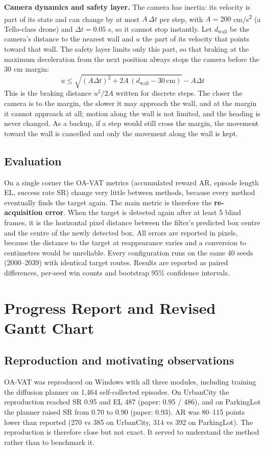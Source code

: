 \documentclass[12pt,a4paper]{article}
\begin{document}
\textbf{Camera dynamics and safety layer.} The camera has inertia: its velocity is part of its state and can change by at most $A\,\Delta t$ per step, with $A = 200$ cm/s\textsuperscript{2} (a Tello-class drone) and $\Delta t = 0.05$ s, so it cannot stop instantly. Let $d_{\mathrm{wall}}$ be the camera's distance to the nearest wall and $u$ the part of its velocity that points toward that wall. The safety layer limits only this part, so that braking at the maximum deceleration from the next position always stops the camera before the 30 cm margin:
\begin{equation}
  u \le \sqrt{(A\Delta t)^2 + 2A\,(d_{\mathrm{wall}} - 30\,\mathrm{cm})} - A\Delta t
\end{equation}
This is the braking distance $u^2/2A$ written for discrete steps. The closer the camera is to the margin, the slower it may approach the wall, and at the margin it cannot approach at all; motion along the wall is not limited, and the heading is never changed. As a backup, if a step would still cross the margin, the movement toward the wall is cancelled and only the movement along the wall is kept.

\subsection{Evaluation}
On a single corner the OA-VAT metrics (accumulated reward AR, episode length EL, success rate SR) change very little between methods, because every method eventually finds the target again. The main metric is therefore the \textbf{re-acquisition error}. When the target is detected again after at least 5 blind frames, it is the horizontal pixel distance between the filter’s predicted box centre and the centre of the newly detected box. All errors are reported in pixels, because the distance to the target at reappearance varies and a conversion to centimetres would be unreliable. Every configuration runs on the same 40 seeds (2000–2039) with identical target routes. Results are reported as paired differences, per-seed win counts and bootstrap 95\% confidence intervals.

\section{Progress Report and Revised Gantt Chart}
\subsection{Reproduction and motivating observations}
OA-VAT was reproduced on Windows with all three modules, including training the diffusion planner on 1,464 self-collected episodes. On UrbanCity the reproduction reached SR 0.95 and EL 487 (paper: 0.95 / 486), and on ParkingLot the planner raised SR from 0.70 to 0.90 (paper: 0.93). AR was 80–115 points lower than reported (270 vs 385 on UrbanCity, 314 vs 392 on ParkingLot). The reproduction is therefore close but not exact. It served to understand the method rather than to benchmark it.
\end{document}
